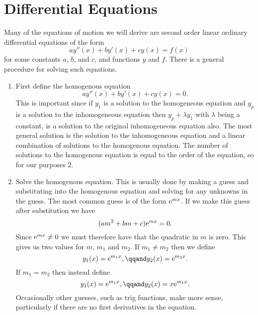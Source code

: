 \chapter{Differential Equations}
Many of the equations of motion we will derive are second order linear ordinary differential equations of the form
\begin{equation}
    ay''(x) + by'(x) + cy(x) = f(x)
\end{equation}
for some constants \(a\), \(b\), and \(c\), and functions \(y\) and \(f\).
There is a general procedure for solving such equations.
\begin{enumerate}
    \item First define the homogenous equation
    \begin{equation}
        ay''(x) + by'(x) + cy(x) = 0.
    \end{equation}
    This is important since if \(y_1\) is a solution to the homogeneous equation and \(y_p\) is a solution to the inhomogeneous equation then \(y_p + \lambda y_1\) with \(\lambda\) being a constant, is a solution to the original inhomogeneous equation also.
    The most general solution is the solution to the inhomogeneous equation and a linear combination of solutions to the homogenous equation.
    The number of solutions to the homogenous equation is equal to the order of the equation, so for our purposes 2.
    \item Solve the homogenous equation.
    This is usually done by making a guess and substituting into the homogenous equation and solving for any unknowns in the guess.
    The most common guess is of the form \(\mathrm{e}^{mx}\).
    If we make this guess after substitution we have
    \begin{equation}
        (am^2 + bm + c)\mathrm{e}^{mx} = 0.
    \end{equation}
    Since \(\mathrm{e}^{mx} \ne 0\) we must therefore have that the quadratic in \(m\) is zero.
    This gives us two values for \(m\), \(m_1\) and \(m_2\).
    If \(m_1 \ne m_2\) then we define
    \begin{equation}
        y_1(x) = \e^{m_1x}, \qqand y_2(x) = \e^{m_2x}.
    \end{equation}
    If \(m_1 = m_2\) then instead define
    \begin{equation}
        y_1(x) = \e^{m_1x}, \qqand y_2(x) = x\e^{m_1x}.
    \end{equation}
    Occasionally other guesses, such as trig functions, make more sense, particularly if there are no first derivatives in the equation.
    

\end{enumerate}
